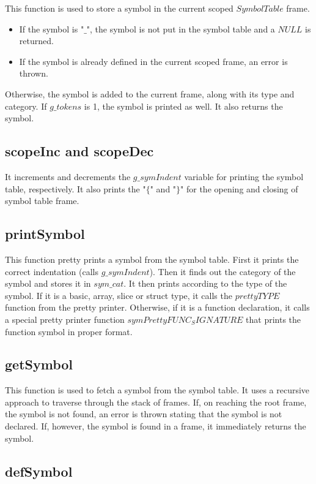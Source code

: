 \documentclass[preprint,12pt]{elsarticle}
\begin{document}
This function is used to store a symbol in the current scoped $SymbolTable$ frame. 
\begin{itemize}
\item If the symbol is "$\_$", the symbol is not put in the symbol table and a $NULL$ is returned.
\item If the symbol is already defined in the current scoped frame, an error is thrown.
\end{itemize}
Otherwise, the symbol is added to the current frame, along with its type and category. If $g\_tokens$ is 1, the symbol is printed as well. It also returns the symbol.

\subsection{scopeInc and scopeDec}

It increments and decrements the $g\_symIndent$ variable for printing the symbol table, respectively. It also prints the "$\{$" and "$\}$" for the opening and closing of symbol table frame.

\subsection{printSymbol}

This function pretty prints a symbol from the symbol table. First it prints the correct indentation (calls $g\_symIndent$). Then it finds out the category of the symbol and stores it in $sym\_cat$. It then prints according to the type of the symbol. If it is a basic, array, slice or struct type, it calls the $prettyTYPE$ function from the pretty printer. Otherwise, if it is a function declaration, it calls a special pretty printer function $symPrettyFUNC_SIGNATURE$ that prints the function symbol in proper format.

\subsection{getSymbol}

This function is used to fetch a symbol from the symbol table. It uses a recursive approach to traverse through the stack of frames. If, on reaching the root frame, the symbol is not found, an error is thrown stating that the symbol is not declared. If, however, the symbol is found in a frame, it immediately returns the symbol.

\subsection{defSymbol}
\end{document}
